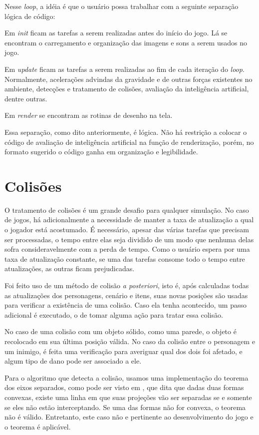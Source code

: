 \documentclass[brazil]{abnt}
\begin{document}
Nesse \textit{loop}, a idéia é que o usuário possa trabalhar com a seguinte separação lógica de código:

Em \textit{init} ficam as tarefas a serem realizadas antes do início do jogo. Lá se encontram o carregamento e organização das imagens e sons a serem usados no jogo. 

Em \textit{update} ficam as tarefas a serem realizadas ao fim de cada iteração do \textit{loop}. Normalmente, acelerações advindas da gravidade e de outras forças existentes no ambiente, detecções e tratamento de colisões, avaliação da inteligência artificial, dentre outras.

Em \textit{render} se encontram as rotinas de desenho na tela.

Essa separação, como dito anteriormente, é lógica. Não há restrição a colocar o código de avaliação de inteligência artificial na função de renderização, porém, no formato sugerido o código ganha em organização e legibilidade.

\section{Colisões}

O tratamento de colisões é um grande desafio para qualquer simulação. No caso de jogos, há adicionalmente a necessidade de manter a taxa de atualização a qual o jogador está acostumado. É necessário, apesar das várias tarefas que precisam ser processadas, o tempo entre elas seja dividido de um modo que nenhuma delas sofra consideravelmente com a perda de tempo. Como o usuário espera por uma taxa de atualização constante, se uma das tarefas consome todo o tempo entre atualizações, as outras ficam prejudicadas.

Foi feito uso de um método de colisão \textit{a posteriori}, isto é, após calculadas todas as atualizações dos personagens, cenário e itens, suas novas posições são usadas para verificar a existência de uma colisão. Caso ela tenha acontecido, um passo adicional é executado, o de tomar alguma ação para tratar essa colisão.

No caso de uma colisão com um objeto sólido, como uma parede,  o objeto é recolocado em sua última posição válida. No caso da colisão entre o personagem e um inimigo, é feita uma verificação para averiguar qual dos dois foi afetado, e algum tipo de dano pode ser associado a ele.

Para o algoritmo que detecta a colisão, usamos uma implementação do teorema dos eixos separados, como pode ser visto em \cite{SeparatingAxes}, que dita que dadas duas formas convexas, existe uma linha em que suas projeções vão ser separadas se e somente se eles não estão interceptando. Se uma das formas não for convexa, o teorema não é válido. Entretanto, este caso não e pertinente ao desenvolvimento do jogo e o teorema é aplicável.
\end{document}
